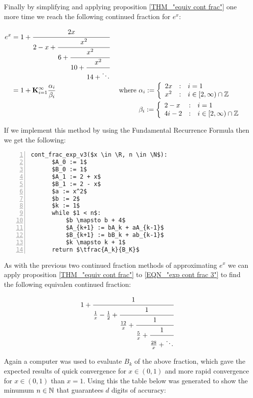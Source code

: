 Finally by simplifying and applying proposition \ref{THM_"equiv cont frac"} one more time we reach the following continued fraction for \(e^x\):

\begin{align}
e^x &= 1 + \cfrac{2x}{2-x+
		   \cfrac{x^2}{6 +
		   \cfrac{x^2}{10+
		   \cfrac{x^2}{14+\ddots} } } } \label{EQN_"exp cont frac 3"}\\
	&= 1 + \mathbf{K}_{i=1}^\infty \frac{\alpha_i}{\beta_i}
		&\textrm{ where }
		&\alpha_i := \left\{\begin{array}{lcl}
			2x &:& i = 1\\
			x^2 &:& i \in [2, \infty)\cap\mathbb{Z}
			\end{array}\right.\nonumber\\
	&&	&\beta_i := \left\{\begin{array}{lcl}
			2 - x &:& i = 1\\
			4i - 2 &:& i \in [2, \infty)\cap \mathbb{Z}
			\end{array}\right.\nonumber
\end{align}

If we implement this method by using the Fundamental Recurrence Formula then we get the following:

\begin{lstlisting}[numbers=left,frame=single,mathescape,caption={Continued fraction for \(e^x\) version 3},label={PCD_"cont exp v3"}]
  cont_frac_exp_v3($x \in \R, n \in \N$):
      $A_0 := 1$
      $B_0 := 1$
      $A_1 := 2 + x$
      $B_1 := 2 - x$
      $a := x^2$
      $b := 2$
      $k := 1$
      while $1 < n$:
          $b \mapsto b + 4$
          $A_{k+1} := bA_k + aA_{k-1}$
          $B_{k+1} := bB_k + ab_{k-1}$
          $k \mapsto k + 1$
      return $\tfrac{A_k}{B_K}$
\end{lstlisting}

As with the previous two continued fraction methods of approximating \(e^x\) we can apply proposition \ref{THM_"equiv cont frac"} to \ref{EQN_"exp cont frac 3"} to find the following equivalen continued fraction:

\begin{displaymath}
	1 + \cfrac{1}{\frac{1}{x} - \frac{1}{2} +
		\cfrac{1}{\frac{12}{x} + 
		\cfrac{1}{\frac{5}{x} +
		\cfrac{1}{\frac{28}{x} + \ddots } } } }
\end{displaymath}

Again a computer was used to evaluate \(B_k\) of the above fraction, which gave the expected results of quick convergence for \(x \in (0,1)\) and more rapid convergence for \(x \in (0,1)\) than \(x = 1\). Using this the table below was generated to show the minumum \(n \in \mathbb{N}\) that guarantees \(d\) digits of accuracy:

